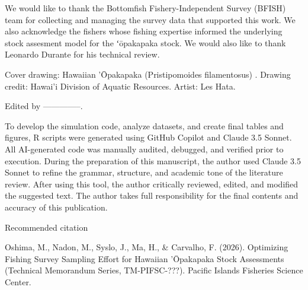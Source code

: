 {\fontsize{12pt}{14pt}\selectfont We would like to thank the Bottomfish Fishery-Independent Survey (BFISH) team for collecting and managing the survey data that supported this work. We also acknowledge the fishers whose fishing expertise informed the underlying stock assesment model for the ʻōpakapaka stock. We would also like to thank Leonardo Durante for his technical review. \par}
\vspace{0.25cm}

{\fontsize{12pt}{14pt}\selectfont Cover drawing: Hawaiian 'Ōpakapaka \fontsize{12pt}{14pt}\selectfont(Pristipomoides filamentosus) \fontsize{12pt}{14pt}\selectfont. Drawing credit: Hawai'i Division of Aquatic Resources. Artist: Les Hata.\par}
\vspace{0.25cm}

{\fontsize{12pt}{14pt}\selectfont Edited by --------------.\par}
\vspace{0.25cm}

{\fontsize{12pt}{14pt}\selectfont To develop the simulation code, analyze datasets, and create final tables and figures, R scripts were generated using GitHub Copilot and Claude 3.5 Sonnet. All AI-generated code was manually audited, debugged, and verified prior to execution. During the preparation of this manuscript, the author used Claude 3.5 Sonnet to refine the grammar, structure, and academic tone of the literature review. After using this tool, the author critically reviewed, edited, and modified the suggested text. The author takes full responsibility for the final contents and accuracy of this publication. \par}
\vspace{0.5cm}

{\fontsize{14pt}{16pt}\selectfont Recommended citation\par}
\vspace{0.25cm}

{\fontsize{12pt}{14pt}\selectfont Oshima, M., Nadon, M., Syslo, J., Ma, H., \& Carvalho, F. (2026). Optimizing Fishing Survey Sampling Effort for Hawaiian 'Ōpakapaka Stock Assessments (Technical Memorandum Series, TM-PIFSC-???). Pacific Islands Fisheries Science Center.\par}
\vspace{0.5cm}

